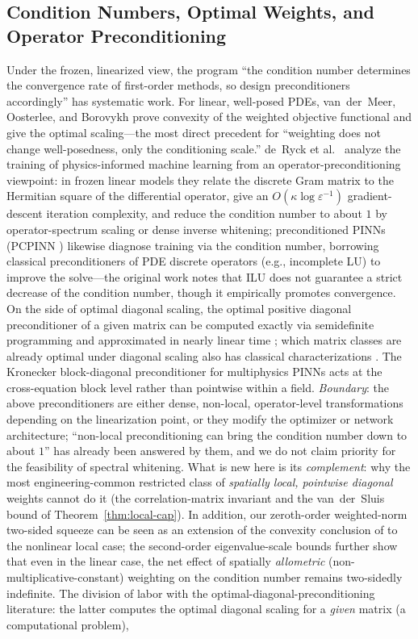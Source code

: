 \documentclass[11pt]{article}
\numberwithin{equation}{section}
\begin{document}
\subsection{Condition Numbers, Optimal Weights, and Operator Preconditioning}\label{sec:rel-precond}
Under the frozen, linearized view, the program ``the condition number determines the convergence rate of first-order methods, so design preconditioners accordingly'' has systematic work. For linear, well-posed PDEs, van~der~Meer, Oosterlee, and Borovykh \cite{vanDerMeer2020} prove convexity of the weighted objective functional and give the optimal scaling---the most direct precedent for ``weighting does not change well-posedness, only the conditioning scale.'' de~Ryck et al.\ \cite{deRyckOp2024} analyze the training of physics-informed machine learning from an operator-preconditioning viewpoint: in frozen linear models they relate the discrete Gram matrix to the Hermitian square of the differential operator, give an $O(\kappa\log\varepsilon^{-1})$ gradient-descent iteration complexity, and reduce the condition number to about $1$ by operator-spectrum scaling or dense inverse whitening; preconditioned PINNs (PCPINN \cite{PCPINN2024}) likewise diagnose training via the condition number, borrowing classical preconditioners of PDE discrete operators (e.g., incomplete LU) to improve the solve---the original work notes that ILU does not guarantee a strict decrease of the condition number, though it empirically promotes convergence. On the side of optimal diagonal scaling, the optimal positive diagonal preconditioner of a given matrix can be computed exactly via semidefinite programming and approximated in nearly linear time \cite{Qu2025ODP,Jambulapati2020,Gao2024SODP}; which matrix classes are already optimal under diagonal scaling also has classical characterizations \cite{ForsytheStraus1955,Shapiro1982,LivneGolub2004}. The Kronecker block-diagonal preconditioner for multiphysics PINNs \cite{KroneckerPINN2026} acts at the cross-equation block level rather than pointwise within a field. \emph{Boundary}: the above preconditioners are either dense, non-local, operator-level transformations depending on the linearization point, or they modify the optimizer or network architecture; ``non-local preconditioning can bring the condition number down to about $1$'' has already been answered by them, and we do not claim priority for the feasibility of spectral whitening. What is new here is its \emph{complement}: why the most engineering-common restricted class of \emph{spatially local, pointwise diagonal} weights cannot do it (the correlation-matrix invariant and the van~der~Sluis bound of Theorem~\ref{thm:local-cap}). In addition, our zeroth-order weighted-norm two-sided squeeze can be seen as an extension of the convexity conclusion of \cite{vanDerMeer2020} to the nonlinear local case; the second-order eigenvalue-scale bounds further show that even in the linear case, the net effect of spatially \emph{allometric} (non-multiplicative-constant) weighting on the condition number remains two-sidedly indefinite. The division of labor with the optimal-diagonal-preconditioning literature: the latter computes the optimal diagonal scaling for a \emph{given} matrix (a computational problem), 
\end{document}
